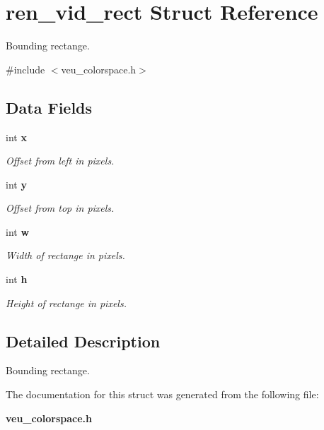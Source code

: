 \section{ren\_\-vid\_\-rect Struct Reference}
\label{structren__vid__rect}


Bounding rectange.  




{\ttfamily \#include $<$veu\_\-colorspace.h$>$}

\subsection*{Data Fields}
\begin{DoxyCompactItemize}
\item 
int {\bf x}\label{structren__vid__rect_a2297868cbfa38ebf831d1ed6055e3ab2}

\begin{DoxyCompactList}\small\item\em Offset from left in pixels. \item\end{DoxyCompactList}\item 
int {\bf y}\label{structren__vid__rect_a39f8dc3bf01894c52dccc9e7b894c465}

\begin{DoxyCompactList}\small\item\em Offset from top in pixels. \item\end{DoxyCompactList}\item 
int {\bf w}\label{structren__vid__rect_a6febc93df4f74bbd707d71c5ea9c6c1e}

\begin{DoxyCompactList}\small\item\em Width of rectange in pixels. \item\end{DoxyCompactList}\item 
int {\bf h}\label{structren__vid__rect_ad26ca0b9f79e460612ec11eadd156f38}

\begin{DoxyCompactList}\small\item\em Height of rectange in pixels. \item\end{DoxyCompactList}\end{DoxyCompactItemize}


\subsection{Detailed Description}
Bounding rectange. 

The documentation for this struct was generated from the following file:\begin{DoxyCompactItemize}
\item 
{\bf veu\_\-colorspace.h}\end{DoxyCompactItemize}
